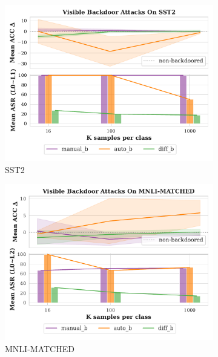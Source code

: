 \begin{figure}[!ht]
\begin{subfigure}{.33\textwidth}
  \centering
  \includegraphics[width=\linewidth]{figures/evaluation_media/SST2_score_n_attack.pdf}
  \caption{SST2}
  \label{fig:sst}
\end{subfigure}%
\begin{subfigure}{.33\textwidth}
  \centering
  \includegraphics[width=\linewidth]{figures/evaluation_media/MNLI-MATCHED_score_n_attack.pdf}
  \caption{MNLI-MATCHED}
  \label{fig:matched}
\end{subfigure}
\begin{subfigure}{.33\textwidth}
  \centering

\end{subfigure}
\end{figure}
